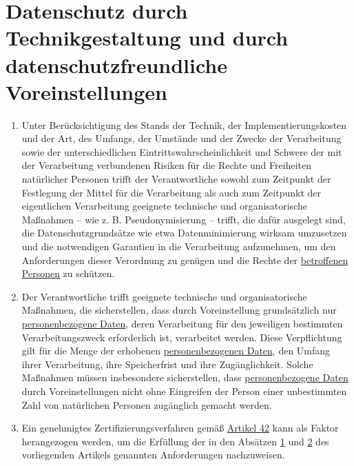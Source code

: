 \chapter{Datenschutz durch Technikgestaltung und durch datenschutzfreundliche Voreinstellungen}
\label{ch:25}


\begin{enumerate}

  \item Unter Berücksichtigung des Stands der Technik, der Implementierungskosten und der Art, des Umfangs, der Umstände
   und der Zwecke der Verarbeitung sowie der unterschiedlichen Eintrittswahrscheinlichkeit und Schwere der mit der
   Verarbeitung verbundenen Risiken für die Rechte und Freiheiten natürlicher Personen trifft der Verantwortliche
   sowohl zum Zeitpunkt der Festlegung der Mittel für die Verarbeitung als auch zum Zeitpunkt der eigentlichen
   Verarbeitung geeignete technische und organisatorische Maßnahmen -- wie z. B. Pseudonymisierung -- trifft, die dafür
   ausgelegt sind, die Datenschutzgrundsätze wie etwa Datenminimierung wirksam umzusetzen und die notwendigen Garantien
   in die Verarbeitung aufzunehmen, um den Anforderungen dieser Verordnung zu genügen und die Rechte der \hyperref[itm:04-1]{betroffenen
   Personen} zu schützen.
  \label{itm:25-1}

  \item Der Verantwortliche trifft geeignete technische und organisatorische Maßnahmen, die sicherstellen, dass durch
   Voreinstellung grundsätzlich nur \hyperref[itm:04-1]{personenbezogene Daten}, deren Verarbeitung für den jeweiligen bestimmten
   Verarbeitungszweck erforderlich ist, verarbeitet werden. Diese Verpflichtung gilt für die Menge der erhobenen
   \hyperref[itm:04-1]{personenbezogenen Daten}, den Umfang ihrer Verarbeitung, ihre Speicherfrist und ihre Zugänglichkeit. Solche Maßnahmen
   müssen insbesondere sicherstellen, dass \hyperref[itm:04-1]{personenbezogene Daten} durch Voreinstellungen nicht ohne Eingreifen der
   Person einer unbestimmten Zahl von natürlichen Personen zugänglich gemacht werden.
  \label{itm:25-2}

  \item Ein genehmigtes Zertifizierungsverfahren gemäß \hyperref[ch:42]{Artikel 42} kann als Faktor herangezogen werden,
   um die Erfüllung der in den Absätzen \hyperref[itm:25-1]{1} und \hyperref[itm:25-2]{2} des vorliegenden Artikels
   genannten Anforderungen nachzuweisen.
  \label{itm:25-3}

\end{enumerate}


